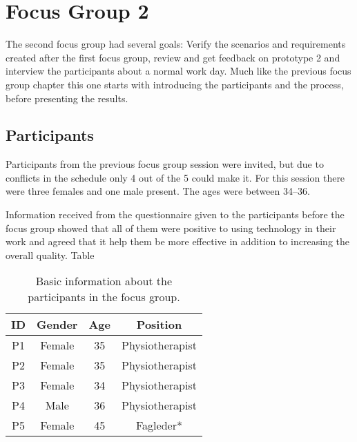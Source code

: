 \chapter{Focus Group 2}
\label{ch:focusGroup2}
The second focus group had several goals: Verify the scenarios and requirements created after the first focus group, review and get feedback on prototype 2 and interview the participants about a normal work day. Much like the previous focus group chapter this one starts with introducing the participants and the process, before presenting the results.

\section{Participants}
Participants from the previous focus group session were invited, but due to conflicts in the schedule only 4 out of the 5 could make it. For this session there were three females and one male present. The ages were between 34--36.

Information received from the questionnaire given to the participants before the focus group showed that all of them were positive to using technology in their work and agreed that it help them be more effective in addition to increasing the overall quality. Table

\begin{table}[h!]
  \begin{center}
  \begin{tabular}{|c|c|c|c|}
    \hline
    \textbf{ID} & \textbf{Gender} & \textbf{Age} & \textbf{Position} \\ \hline
    P1 & Female & 35 & Physiotherapist \\ \hline
    P2 & Female & 35 & Physiotherapist \\ \hline
    P3 & Female & 34 & Physiotherapist \\ \hline
    P4 & Male & 36 & Physiotherapist \\ \hline
    P5 & Female & 45 & Fagleder* \\ \hline
  \end{tabular}
  \end{center}
  \caption{Basic information about the participants in the focus group.}
  \label{tab:participants}
\end{table}



